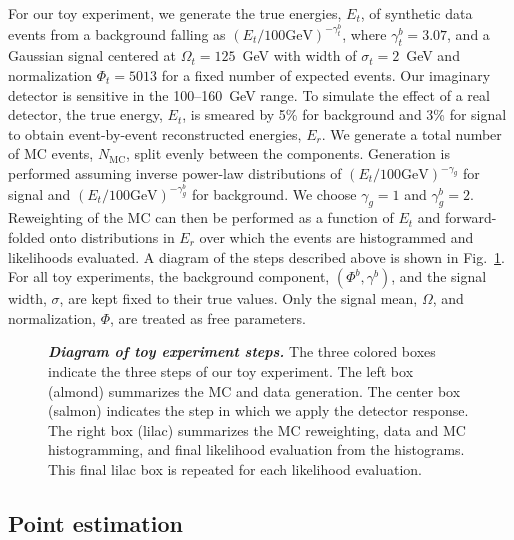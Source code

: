 For our toy experiment, we generate the true energies, $E_t$, of synthetic data events from a background falling as $(E_t/100 \mathrm{GeV})^{-\gamma_t^b}$, where $\gamma_t^b=3.07$, and a Gaussian signal centered at $\Omega_t=125$~GeV with width of $\sigma_t=2$~GeV and normalization $\Phi_t=5013$ for a fixed number of expected events. Our imaginary detector is sensitive in the 100--160~GeV range. To simulate the effect of a real detector, the true energy, $E_t$, is smeared by 5\% for background and 3\% for signal to obtain event-by-event reconstructed energies, $E_r$. We generate a total number of MC events, $N_{\mathrm{MC}}$, split evenly between the components. Generation is performed assuming inverse power-law distributions of $(E_t/100 \mathrm{GeV})^{-\gamma_g}$ for signal and $(E_t/100 \mathrm{GeV})^{-\gamma_g^b}$ for background. We choose $\gamma_g=1$ and $\gamma_g^b=2$. Reweighting of the MC can then be performed as a function of $E_t$ and forward-folded onto distributions in $E_r$ over which the events are histogrammed and likelihoods evaluated. A diagram of the steps described above is shown in Fig.~\ref{fig:mc_diagram}. For all toy experiments, the background component, $(\Phi^b,\gamma^b)$, and the signal width, $\sigma$, are kept fixed to their true values. Only the signal mean, $\Omega$, and normalization, $\Phi$, are treated as free parameters.

\begin{figure}[htp]
	\caption{\textbf{\textit{Diagram of toy experiment steps.}} The three colored boxes indicate the three steps of our toy experiment. The left box (almond) summarizes the MC and data generation. The center box (salmon) indicates the step in which we apply the detector response. The right box (lilac) summarizes the MC reweighting, data and MC histogramming, and final likelihood evaluation from the histograms. This final lilac box is repeated for each likelihood evaluation.}
	\label{fig:mc_diagram}
\end{figure}

\subsection{Point estimation}
\label{sec:pointestimation}

